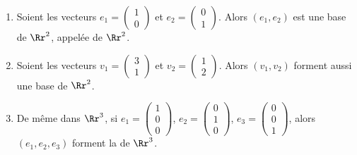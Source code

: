 \documentclass[class=report,crop=false]{standalone}
\begin{document}
\begin{exemple}
\sauteligne
\begin{enumerate}
  \item Soient les vecteurs
  $e_1=\left(\begin{smallmatrix}1\\0\end{smallmatrix}\right)$ et
  $e_2 = \left(\begin{smallmatrix}0\\1\end{smallmatrix}\right)$.
Alors $(e_1,e_2)$ est une base de $\Rr^2$, appelée  de $\Rr^2$.

  \item Soient les vecteurs $v_1=\left(\begin{smallmatrix}3\\1\end{smallmatrix}\right)$
  et $v_2=\left(\begin{smallmatrix}1\\2\end{smallmatrix}\right)$.
Alors $(v_1,v_2)$ forment aussi une base de $\Rr^2$.

  \item De même dans $\Rr^3$, si
  $e_1 = \left(\begin{smallmatrix}1\\0\\0\end{smallmatrix}\right)$,
  $e_2 = \left(\begin{smallmatrix}0\\1\\0\end{smallmatrix}\right)$,
  $e_3 = \left(\begin{smallmatrix}0\\0\\1\end{smallmatrix}\right)$,
  alors $(e_1,e_2,e_3)$ forment la  de $\Rr^3$.

\end{enumerate}
\end{exemple}
\end{document}
